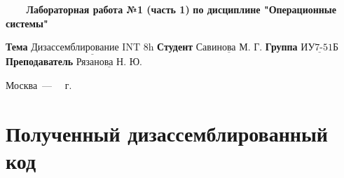 \documentclass[a4paper,12pt]{article}
\begin{document}
\begin{center}
	\noindent\begin{minipage}{1.3\textwidth}\centering
	\Large\textbf{   ~~~ Лабораторная работа №1 (часть 1)}\newline
	\textbf{по дисциплине "Операционные системы"}\newline\newline\newline
	\end{minipage}
\end{center}

\noindent\textbf{Тема} $\underline{\text{Дизассемблирование INT 8h}}$\newline\newline
\noindent\textbf{Студент} $\underline{\text{Савинова М. Г.}}$\newline\newline
\noindent\textbf{Группа} $\underline{\text{ИУ7-51Б}}$\newline\newline
\noindent\textbf{Преподаватель} $\underline{\text{Рязанова Н. Ю.}}$\newline

\begin{center}
	\vfill
	Москва~---~\the\year
~г.
\end{center}
\clearpage

\section{Полученный дизассемблированный код}
\end{document}
